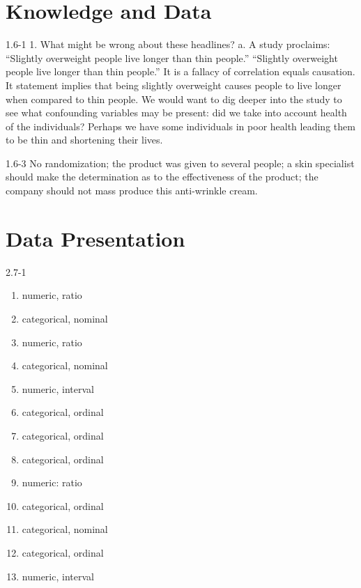 \setcounter{chapter}{1}\chapter{Knowledge and Data}
\begin{exsol@solution}{1.6-1}
1.  What might be wrong about these headlines?
  a.	A study proclaims: ``Slightly overweight people live longer than thin people.'' ``Slightly overweight people live longer than thin people.''  It is a fallacy of correlation equals causation.  It statement implies that being slightly overweight causes people to live longer when compared to thin people.  We would want to dig deeper into the study to see what confounding variables may be present: did we take into account health of the individuals?  Perhaps we have some individuals in poor health leading them to be thin and shortening their lives.

\end{exsol@solution}
\begin{exsol@solution}{1.6-3}
No randomization; the product was given to several people; a skin specialist should make the determination as to the effectiveness of the product; the company should not mass produce this anti-wrinkle cream.

\end{exsol@solution}
\setcounter{chapter}{2}\chapter{Data Presentation}
\begin{exsol@solution}{2.7-1}
    \begin{enumerate}
	  \item   numeric, ratio
    \item  categorical, nominal
    \item  numeric, ratio
    \item  categorical, nominal
    \item  numeric, interval
    \item  categorical, ordinal
    \item  categorical, ordinal
    \item  categorical, ordinal
    \item  numeric: ratio
    \item  categorical, ordinal
    \item  categorical, nominal
    \item  categorical, ordinal
    \item  numeric, interval
  	\end{enumerate}
\end{exsol@solution}
